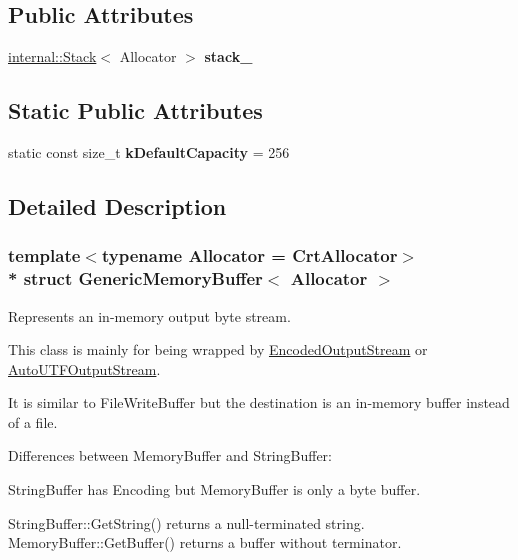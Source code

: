 \subsection*{Public Attributes}
\begin{DoxyCompactItemize}
\item 
\hyperlink{classinternal_1_1_stack}{internal\+::\+Stack}$<$ Allocator $>$ {\bfseries stack\+\_\+}\hypertarget{struct_generic_memory_buffer_a977b479180bebe8ae14ca1c11d52a486}{}\label{struct_generic_memory_buffer_a977b479180bebe8ae14ca1c11d52a486}

\end{DoxyCompactItemize}
\subsection*{Static Public Attributes}
\begin{DoxyCompactItemize}
\item 
static const size\+\_\+t {\bfseries k\+Default\+Capacity} = 256\hypertarget{struct_generic_memory_buffer_af6ecdbdbb8d3aa53cdef6e788e4980be}{}\label{struct_generic_memory_buffer_af6ecdbdbb8d3aa53cdef6e788e4980be}

\end{DoxyCompactItemize}


\subsection{Detailed Description}
\subsubsection*{template$<$typename Allocator = Crt\+Allocator$>$\\*
struct Generic\+Memory\+Buffer$<$ Allocator $>$}

Represents an in-\/memory output byte stream. 

This class is mainly for being wrapped by \hyperlink{class_encoded_output_stream}{Encoded\+Output\+Stream} or \hyperlink{class_auto_u_t_f_output_stream}{Auto\+U\+T\+F\+Output\+Stream}.

It is similar to File\+Write\+Buffer but the destination is an in-\/memory buffer instead of a file.

Differences between Memory\+Buffer and String\+Buffer\+:
\begin{DoxyEnumerate}
\item String\+Buffer has Encoding but Memory\+Buffer is only a byte buffer.
\item String\+Buffer\+::\+Get\+String() returns a null-\/terminated string. Memory\+Buffer\+::\+Get\+Buffer() returns a buffer without terminator.
\end{DoxyEnumerate}


